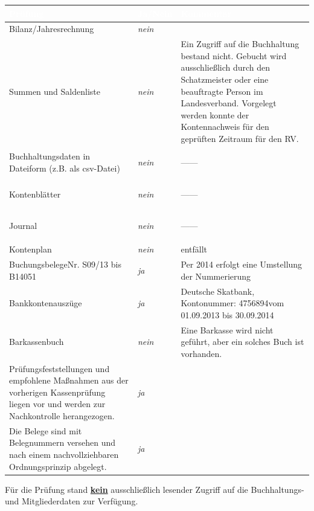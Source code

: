 \documentclass[%
	titlepage,oneside,12pt,headlines=1.5,numbers=noenddot, chapterprefix=false,parskip=full-,DIV=14,pagesize]{scrreprt}
\newcommand*{\ditto}{\begin{center}\vspace{-0.40in}---\quad \textquotedbl\quad ---\vspace{-0.24in}\end{center}}
\begin{document}
\begin{longtable}[ht]{|p{} p{} p{}|}
\hline\rowcolor{pirateorange} 
	\textcolor{white}{\textbf{Prüfung}} & \textcolor{white}{\textbf{Ja/Nein}} & \textcolor{white}{\textbf{Kommentar}}\\\endhead
        \footnotesize Bilanz/Jahresrechnung & \footnotesize \textit{nein} & \footnotesize  \\ 
        \footnotesize Summen und Saldenliste & \footnotesize \textit{nein} & \scriptsize Ein Zugriff auf die Buchhaltung bestand nicht. Gebucht wird ausschließlich durch den Schatzmeister oder eine beauftragte Person im Landesverband. Vorgelegt werden konnte der Kontennachweis für den geprüften Zeitraum für den RV. \\
        \footnotesize Buchhaltungsdaten in Dateiform (z.B. als csv-Datei) & \footnotesize \textit{nein} & \ditto  \\
        \footnotesize Kontenblätter & \footnotesize \textit{nein} &  \ditto \\
        \footnotesize Journal & \footnotesize \textit{nein} & \ditto \\
        \footnotesize Kontenplan & \footnotesize \textit{nein} & \footnotesize entfällt \\
        \footnotesize Buchungsbelege\newline Nr. S09/13 bis B14051 & \footnotesize \textit{ja} & \footnotesize Per 2014 erfolgt eine Umstellung der Nummerierung \\
        \footnotesize Bankkontenauszüge & \footnotesize \textit{ja} & \footnotesize Deutsche Skatbank, Kontonummer: 4756894\newline vom 01.09.2013 bis 30.09.2014 \\
        \footnotesize Barkassenbuch & \footnotesize \textit{nein} & \footnotesize Eine Barkasse wird nicht geführt, aber ein solches Buch ist vorhanden. \\
        \footnotesize Prüfungsfeststellungen und empfohlene Maßnahmen aus der vorherigen Kassenprüfung liegen vor und werden zur Nachkontrolle herangezogen. & \footnotesize \textit{ja} & \footnotesize \\
        \footnotesize Die Belege sind mit Belegnummern versehen und nach einem nachvollziehbaren Ordnungsprinzip abgelegt. & \footnotesize \textit{ja} & \footnotesize  \\
\hline
\end{longtable}

Für die Prüfung stand \underline{\textbf{kein}} ausschließlich lesender Zugriff auf die Buchhaltungs- und Mitgliederdaten zur Verfügung.
\end{document}
